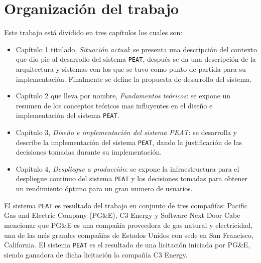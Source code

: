 \section*{Organización del trabajo}

Este trabajo está dividido en tres capítulos los cuales son:
\begin{itemize}
\item Capítulo 1 titulado, \textit{Situación actual}: se presenta una descripción
  del contexto que dio pie al desarrollo del sistema \texttt{PEAT}, después se da una
  descripción de la arquitectura y sistemas con los que se tuvo como punto de
  partida para su implementación. Finalmente se define la propuesta de desarrollo
  del sistema.
\item Capítulo 2 que lleva por nombre, \textit{Fundamentos teóricos}: se expone un
  resumen de los conceptos teóricos mas influyentes en el diseño e implementación del
  sistema \texttt{PEAT}.
\item Capítulo 3, \textit{Diseño e implementación del sistema PEAT}: se desarrolla y
  describe la implementación del sistema \texttt{PEAT}, dando la justificación
  de las decisiones tomadas durante su implementación.
\item Capítulo 4, \textit{Despliegue a producción}: se expone la infraestructura
  para el despliegue continuo del sistema \texttt{PEAT} y los decisiones
  tomadas para obtener un rendimiento óptimo para un gran numero de usuarios.
\end{itemize}

El sistema \texttt{PEAT} es resultado del trabajo en conjunto de tres compañías:
Pacific Gas and Electric Company (PG\&E), C3 Energy y Software Next Door
Cabe mencionar que PG\&E es una compañía proveedora de gas natural y electricidad, una de las
más grandes compañías de Estados Unidos con sede en San Francisco, California.
El sistema \texttt{PEAT} es el resultado de una licitación iniciada por PG\&E,
siendo ganadora de dicha licitación la compañía C3 Energy.

